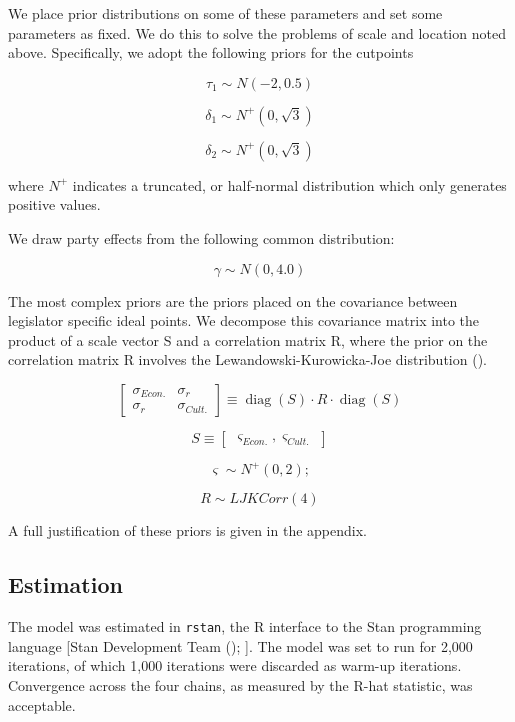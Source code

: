 \documentclass[
]{article}
\begin{document}
We place prior distributions on some of these parameters and set some
parameters as fixed. We do this to solve the problems of scale and
location noted above. Specifically, we adopt the following priors for
the cutpoints

\[
\tau_1 \sim N(-2, 0.5)
\]

\[
\delta_1 \sim N^+(0, \sqrt{3})
\]

\[
\delta_2 \sim N^+(0, \sqrt{3})
\]

where \(N^+\) indicates a truncated, or half-normal distribution which
only generates positive values.

We draw party effects from the following common distribution:

\[
\gamma \sim N(0, 4.0)
\]

The most complex priors are the priors placed on the covariance between
legislator specific ideal points. We decompose this covariance matrix
into the product of a scale vector S and a correlation matrix R, where
the prior on the correlation matrix R involves the
Lewandowski-Kurowicka-Joe distribution
().

\[
\begin{bmatrix} \sigma_{Econ.} & \sigma_r \\ \sigma_r &
\sigma_{Cult.}  \end{bmatrix} \equiv \operatorname{diag}(S) \cdot R \cdot \operatorname{diag}(S) 
\]

\[
S \equiv
\begin{bmatrix}
\varsigma_{Econ.}, \varsigma_{Cult.}
\end{bmatrix}
\]

\[
\varsigma \sim N^{+}(0, 2);
\]

\[
R \sim LJKCorr(4)
\]

A full justification of these priors is given in the appendix.

\subsection{Estimation}\label{estimation}

The model was estimated in \texttt{rstan}, the R interface to the Stan
programming language {[}Stan Development Team
(); {]}. The model was set to run for 2,000
iterations, of which 1,000 iterations were discarded as warm-up
iterations. Convergence across the four chains, as measured by the R-hat
statistic, was acceptable.
\end{document}

